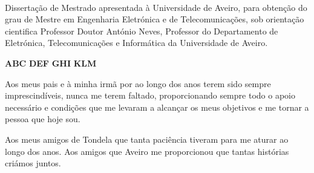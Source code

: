 \TitlePage

  \HEADER{\BAR}
         {\ThesisYear}
  \TITLE{\myName}
        {\TituloTese}
        {\ThesisTitle}
\EndTitlePage
\titlepage\ \endtitlepage %


%
%

\TitlePage
  \HEADER{}{\ThesisYear}
  \TITLE{\myName}
        {\TituloTese}
        {\ThesisTitle}
  \vskip 15mm
  \TEXT{}
       {Dissertação de Mestrado apresentada à Universidade de Aveiro, para obtenção do grau de Mestre em Engenharia Eletrónica e de Telecomunicações, sob orientação cientifica Professor Doutor António Neves, Professor do Departamento de Eletrónica, Telecomunicações e Informática da Universidade de Aveiro.}
\EndTitlePage
\titlepage\ \endtitlepage %

\TitlePage
  \vspace*{55mm}
       {}
       {\textbf{ABC}}
  \vspace*{5mm}
       {\textbf{DEF}}
  \vspace*{5mm}
  \TEXT{}
       {\textbf{GHI}}
  \vspace*{5mm}
  \TEXT{}
       {\textbf{KLM}}
\EndTitlePage
\titlepage\ \endtitlepage %

\TitlePage
  \vspace*{55mm}
       {Aos meus pais e à minha irmã por ao longo dos anos terem sido sempre imprescindíveis, nunca me terem faltado, proporcionando sempre todo o apoio necessário e condições que me levaram a alcançar os meus objetivos e me tornar a pessoa que hoje sou.}
  
  \TEXT{}
       {Aos meus amigos de Tondela que tanta paciência tiveram para me aturar ao longo dos anos.}
       \TEXT{}
       {Aos amigos que Aveiro me proporcionou que tantas histórias criámos juntos.}

